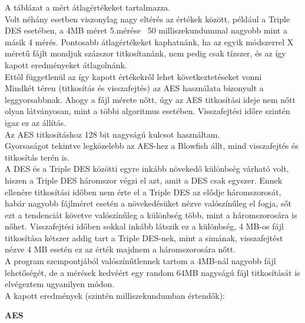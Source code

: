 \noindent A táblázat a mért átlagértékeket tartalmazza.
\vspace{5pt}\\Volt néhány esetben viszonylag nagy eltérés az értékek között, például a Triple DES esetében, a 4MB méret 5.mérése ~50 milliszekundummal nagyobb mint a másik 4 mérés. Pontosabb átlagértékeket kaphatnánk, ha az egyik módszerrel X méretű fájlt mondjuk százszor titkosítanánk, nem pedig csak tízszer, és az így kapott eredményeket átlagolnánk.
\vspace{5pt}\\Ettől függetlenül az így kapott értékekről lehet következtetéseket vonni
\vspace{5pt}\\Mindkét téren (titkosítás és visszafejtés) az AES használata bizonyult a leggyorsabbnak. Ahogy a fájl mérete nőtt, úgy az AES titkosítási ideje nem nőtt olyan látványosan, mint a többi algoritmus esetében. Visszafejtési időre szintén igaz ez az állítás. 
\\Az AES titkosításhoz 128 bit nagyságú kulcsot használtam.
\vspace{5pt}\\Gyorsaságot tekintve legközelebb az AES-hez a Blowfish állt, mind visszafejtés és titkosítás terén is.
\vspace{5pt}\\A DES és a Triple DES közötti egyre inkább növekedő különbség várható volt, hiszen a Triple DES háromszor végzi el azt, amit a DES csak egyszer. Ennek ellenére titkosítási időben nem érte el a Triple DES az elődje háromszorosát, habár nagyobb fájlméret esetén a növekedésüket nézve valószínűleg el fogja, sőt ezt a tendenciát követve valószínűleg a különbség több, mint a háromszorosára is nőhet. Visszafejtési időben sokkal inkább látszik ez a különbség, 4 MB-os fájl titkosítása kétszer addig tart a Triple DES-nek, mint a simának, visszafejtést nézve 4 MB esetén ez az érték majdnem a háromszorosára nőtt.
\vspace{5pt}\\A program szempontjából valószínűtlennek tartom a 4MB-nál nagyobb fájl lehetőségét, de a mérések kedvéért egy random 64MB nagyságú fájl titkosítását is elvégeztem ugyanilyen módon. 
\vspace{5pt}\\A kapott eredmények (szintén milliszekundumban értendők):

\newpage \noindent \textbf{AES}

